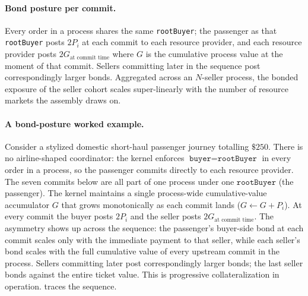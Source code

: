 \documentclass[11pt,a4paper]{article}
\theoremstyle{definition}
\theoremstyle{remark}
\begin{document}
\paragraph{Bond posture per commit.}
Every order in a process shares the same \texttt{rootBuyer}; the
passenger as that \texttt{rootBuyer} posts $2P_i$ at each commit
to each resource provider, and each resource provider posts
$2G_{\text{at commit time}}$ where $G$ is the cumulative
process value at the moment of that commit. Sellers committing
later in the sequence post correspondingly larger bonds.
Aggregated across an $N$-seller process, the bonded exposure of
the seller cohort scales super-linearly with the number of
resource markets the assembly draws on.

\paragraph{A bond-posture worked example.}
Consider a stylized domestic short-haul passenger journey
totalling $\$250$. There is no airline-shaped coordinator: the
kernel enforces $\texttt{buyer} = \texttt{rootBuyer}$ in every
order in a process, so the passenger commits directly to each
resource provider. The seven commits below are all part of one
process under one $\texttt{rootBuyer}$ (the passenger). The
kernel maintains a single process-wide cumulative-value
accumulator $G$ that grows monotonically as each commit lands
($G \leftarrow G + P_i$). At every commit the buyer posts
$2P_i$ and the seller posts $2G_{\text{at commit time}}$. The
asymmetry shows up across the sequence: the passenger's
buyer-side bond at each commit scales only with the immediate
payment to that seller, while each seller's bond scales with
the full cumulative value of every upstream commit in the
process. Sellers committing later post correspondingly larger
bonds; the last seller bonds against the entire ticket value.
This is progressive collateralization in operation.
 traces the sequence.
\end{document}
